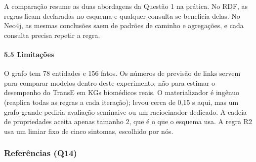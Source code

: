 \documentclass[12pt, a4paper]{article}
\begin{document}
A comparação resume as duas abordagens da Questão 1 na prática. No RDF, as regras ficam declaradas no esquema e qualquer consulta se beneficia delas. No Neo4j, as mesmas conclusões saem de padrões de caminho e agregações, e cada consulta precisa repetir a regra.

\paragraph{5.5 Limitações}\label{55-limitauxe7uxf5es}

O grafo tem 78 entidades e 156 fatos. Os números de previsão de links servem para comparar modelos dentro deste experimento, não para estimar o desempenho do TransE em KGs biomédicos reais. O materializador é ingênuo (reaplica todas as regras a cada iteração); levou cerca de 0,15 s aqui, mas um grafo grande pediria avaliação seminaive ou um raciocinador dedicado. A cadeia de propriedades aceita apenas tamanho 2, que é o que o esquema usa. A regra R2 usa um limiar fixo de cinco sintomas, escolhido por nós.

\subsubsection{Referências (Q14)}\label{referuxeancias-q14}
\end{document}
